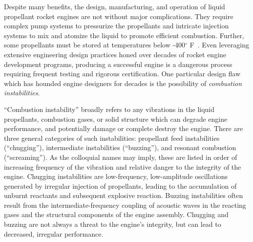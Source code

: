 Despite many benefits, the design, manufacturing, and operation of liquid propellant rocket engines are not without major complications. They require complex pump systems to pressurize the propellants and intricate injection systems to mix and atomize the liquid to promote efficient combustion. Further, some propellants must be stored at temperatures below \mbox{-400$^{\circ}$} F~\cite{liquidHydrogenProps}. Even leveraging extensive engineering design practices honed over decades of rocket engine development programs, producing a successful engine is a dangerous process requiring frequent testing and rigorous certification. One particular design flaw which has hounded engine designers for decades is the possibility of \textit{combustion instabilities}.

``Combustion instability'' broadly refers to any vibrations in the liquid propellants, combustion gases, or solid structure which can degrade engine performance, and potentially damage or complete destroy the engine. There are three general categories of such instabilities: propellant feed instabilities (``chugging''), intermediate instabilities (``buzzing''), and resonant combustion (``screaming''). As the colloquial names may imply, these are listed in order of increasing frequency of the vibration and relative danger to the integrity of the engine. Chugging instabilities are low-frequency, low-amplitude oscillations generated by irregular injection of propellants, leading to the accumulation of unburnt reactants and subsequent explosive reaction. Buzzing instabilities often result from the intermediate-frequency coupling of acoustic waves in the reacting gases and the structural components of the engine assembly. Chugging and buzzing are not always a threat to the engine's integrity, but can lead to decreased, irregular performance.

